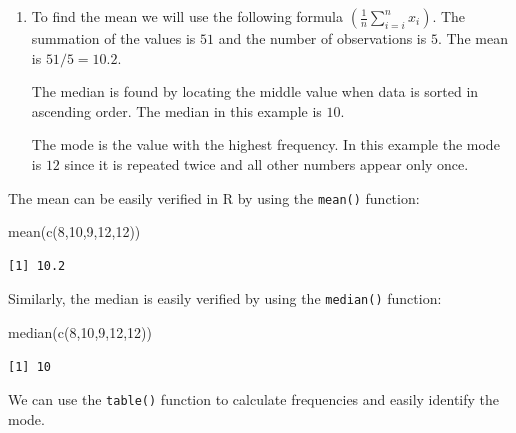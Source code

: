 \documentclass[
  letterpaper,
  DIV=11,
  numbers=noendperiod]{scrreprt}
\newenvironment{Shaded}{\begin{snugshade}}{\end{snugshade}}
\newcommand{\DecValTok}[1]{\textcolor[rgb]{0.68,0.00,0.00}{#1}}
\newcommand{\FunctionTok}[1]{\textcolor[rgb]{0.28,0.35,0.67}{#1}}
\newcommand{\NormalTok}[1]{\textcolor[rgb]{0.00,0.23,0.31}{#1}}
\begin{document}
\begin{blackbox}

\begin{enumerate}
\def\labelenumi{\arabic{enumi}.}
\item
  To find the mean we will use the following formula
  \(( \frac{1}{n} \sum_{i=i}^{n} x_{i})\). The summation of the values
  is \(51\) and the number of observations is \(5\). The mean is
  \(51/5=10.2\).

  The median is found by locating the middle value when data is sorted
  in ascending order. The median in this example is \(10\).

  The mode is the value with the highest frequency. In this example the
  mode is \(12\) since it is repeated twice and all other numbers appear
  only once.
\end{enumerate}

\end{blackbox}

The mean can be easily verified in R by using the \texttt{mean()}
function:

\begin{Shaded}
\begin{Highlighting}[numbers=left,,]
\FunctionTok{mean}\NormalTok{(}\FunctionTok{c}\NormalTok{(}\DecValTok{8}\NormalTok{,}\DecValTok{10}\NormalTok{,}\DecValTok{9}\NormalTok{,}\DecValTok{12}\NormalTok{,}\DecValTok{12}\NormalTok{))}
\end{Highlighting}
\end{Shaded}

\begin{verbatim}
[1] 10.2
\end{verbatim}

Similarly, the median is easily verified by using the \texttt{median()}
function:

\begin{Shaded}
\begin{Highlighting}[numbers=left,,]
\FunctionTok{median}\NormalTok{(}\FunctionTok{c}\NormalTok{(}\DecValTok{8}\NormalTok{,}\DecValTok{10}\NormalTok{,}\DecValTok{9}\NormalTok{,}\DecValTok{12}\NormalTok{,}\DecValTok{12}\NormalTok{))}
\end{Highlighting}
\end{Shaded}

\begin{verbatim}
[1] 10
\end{verbatim}

We can use the \texttt{table()} function to calculate frequencies and
easily identify the mode.
\end{document}
